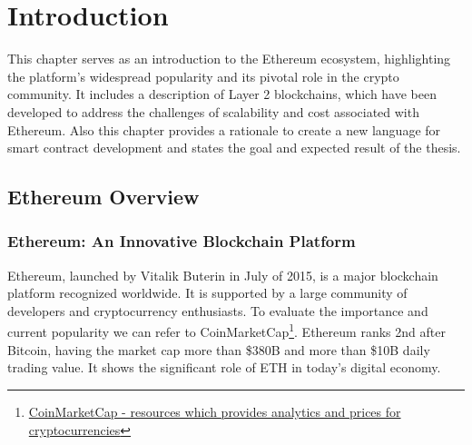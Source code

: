 \chapter{Introduction}
\label{chap:intro}

This chapter serves as an introduction to the Ethereum ecosystem, highlighting the platform's widespread popularity and its pivotal role in the crypto community. It includes a description of Layer 2 blockchains, which have been developed to address the challenges of scalability and cost associated with Ethereum. Also this chapter provides a rationale to create a new language for smart contract development and states the goal and expected result of the thesis.




\section{Ethereum Overview}

\subsection{Ethereum: An Innovative Blockchain Platform}
Ethereum, launched by Vitalik Buterin in July of 2015, is a major blockchain platform recognized worldwide. It is supported by a large community of developers and cryptocurrency enthusiasts. To evaluate the importance and current popularity we can refer to CoinMarketCap\footnote{\href{https://coinmarketcap.com/}{CoinMarketCap - resources which provides analytics and prices for cryptocurrencies}}. Ethereum ranks 2nd after Bitcoin, having the market cap more than \$380B and more than \$10B daily trading value. It shows the significant role of ETH in today’s digital economy.

